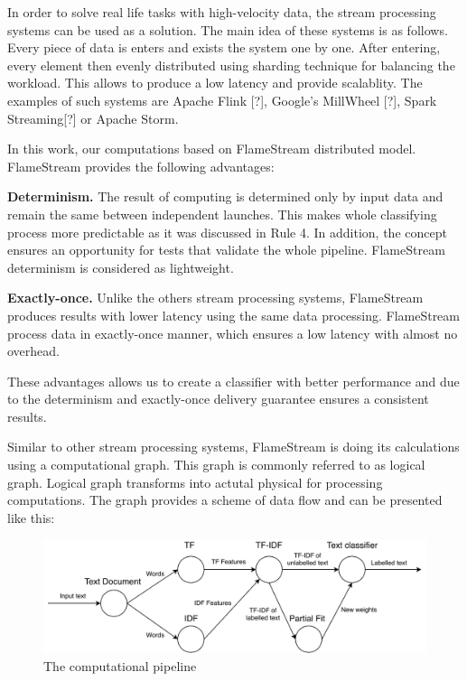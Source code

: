 

In order to solve real life tasks with high-velocity data, the stream processing systems can be used as a solution. The main idea of these systems is as follows. Every piece of data is enters and exists the system one by one. After entering, every element then evenly distributed using sharding technique for balancing the workload. This allows to produce a low latency and provide scalablity. The examples of such systems are Apache Flink [?], Google's MillWheel [?], Spark Streaming[?] or Apache Storm.

In this work, our computations based on FlameStream \cite{kuralenok2018flamestream} distributed model. FlameStream provides the following advantages:

\textbf{Determinism.} The result of computing is determined only by input data and remain the same between independent launches. This makes whole classifying process more predictable as it was discussed in \cite{stonebraker20058} Rule 4. In addition, the concept ensures an opportunity for tests that validate the whole pipeline. FlameStream determinism is considered as lightweight.

\textbf{Exactly-once.} Unlike the others stream processing systems, FlameStream produces results with lower latency using the same data processing. FlameStream process data in exactly-once manner, which ensures a low latency with almost no overhead.

These advantages allows us to create a classifier with better performance and due to the determinism and exactly-once delivery guarantee ensures a consistent results.

Similar to other stream processing systems, FlameStream is doing its calculations using a computational graph. This graph is  commonly referred to as logical graph. Logical graph transforms into actutal physical for processing computations. The graph provides a scheme of data flow and can be presented like this:

\begin{figure}[htbp]
  \centering
  \includegraphics[scale=0.45]{pics/tf-idf-graph}
  \caption{The computational pipeline}
  \label {TF-IDF Graph}
\end{figure}

